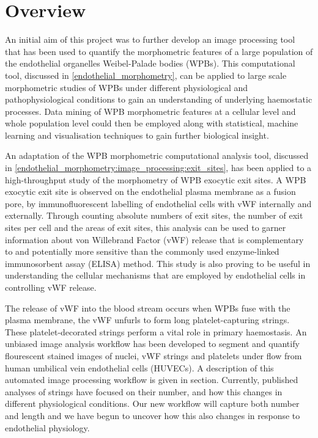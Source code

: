 \section{Overview}
\label{introduction:background}
An initial aim of this project was to further develop an image processing tool that has been used to quantify the morphometric features of a large population of the endothelial organelles Weibel-Palade bodies (WPBs). This computational tool, discussed in \autoref{endothelial_morphometry}, can be applied to large scale morphometric studies of WPBs under different physiological and pathophysiological conditions to gain an understanding of underlying haemostatic processes. Data mining of WPB morphometric features at a cellular level and whole population level could then be employed along with statistical, machine learning and visualisation techniques to gain further biological insight.

An adaptation of the WPB morphometric computational analysis tool, discussed in \autoref{endothelial_morphometry:image_processing:exit_sites}, has been applied to a high-throughput study of the morphometry of WPB exocytic exit sites. A WPB exocytic exit site is observed on the endothelial plasma membrane as a fusion pore, by immunofluorescent labelling of endothelial cells with vWF internally and externally. Through counting absolute numbers of exit sites, the number of exit sites per cell and the areas of exit sites, this analysis can be used to garner information about von Willebrand Factor (vWF) release that is complementary to and potentially more sensitive than the commonly used enzyme-linked immunosorbent assay (ELISA) method. This study is also proving to be useful in understanding the cellular mechanisms that are employed by endothelial cells in controlling vWF release.

The release of vWF into the blood stream occurs when WPBs fuse with the plasma membrane, the vWF unfurls to form long platelet-capturing strings. These platelet-decorated strings perform a vital role in primary haemostasis. An unbiased image analysis workflow has been developed to segment and quantify flourescent stained images of nuclei, vWF strings and platelets under flow from human umbilical vein endothelial cells (HUVECs). A description of this automated image processing workflow is given in section. Currently, published analyses of strings have focused on their number, and how this changes in different physiological conditions. Our new workflow will capture both number and length and we have begun to uncover how this also changes in response to endothelial physiology. 

